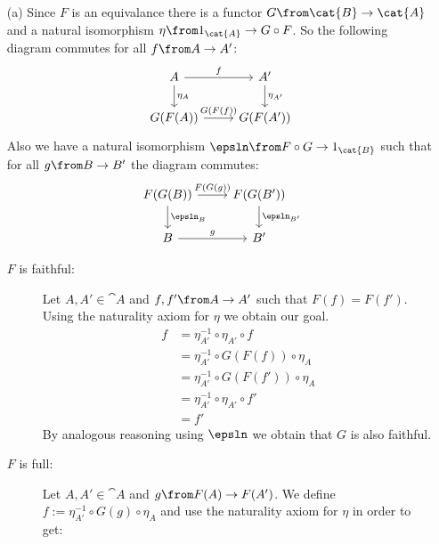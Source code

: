 \begin{answer}
    \begin{itemize}
        \item[(a)]
            Since $F$ is an equivalance there is a functor $G\from \cat{B} \to \cat{A}$ and a natural isomorphism $\eta\from 1_{\cat{A}} \to G \circ F$.
            So the following diagram commutes for all $f\from A \to A'$:
            \[
                \begin{tikzcd}
                    A \arrow{r}{f} \arrow{d}{\eta_A} & A' \arrow{d}{\eta_{A'}} \\
                    G(F(A)) \arrow{r}{G(F(f))}       & G(F(A'))
                \end{tikzcd}
            \]
            Also we have a natural isomorphism $\epsln\from F \circ G \to 1_{\cat{B}}$ such that for all $g\from B \to B'$ the diagram commutes:
            \[
                \begin{tikzcd}
                    F(G(B)) \arrow{d}{\epsln_{B}} \arrow{r}{F(G(g))} & F(G(B')) \arrow{d}{\epsln_{B'}} \\
                    B \arrow{r}{g}  & B'
                \end{tikzcd}
            \]
            \begin{description}
                \item[$F$ is faithful:]
                    Let $A, A' \in \cat{A}$ and $f,f'\from A \to A'$ such that $F(f) = F(f')$.
                    Using the naturality axiom for $\eta$ we obtain our goal.
                    \begin{align*}
                        f & = \eta_{A'}^{-1} \circ \eta_{A'} \circ f\\
                          & = \eta_{A'}^{-1} \circ G(F(f)) \circ \eta_A\\
                          & = \eta_{A'}^{-1} \circ G(F(f')) \circ \eta_A\\
                          & = \eta_{A'}^{-1} \circ \eta_{A'} \circ f'\\
                          & = f'
                    \end{align*}
                    By analogous reasoning using $\epsln$ we obtain that $G$ is also faithful.
                \item[$F$ is full:]
                    Let $A, A' \in \cat{A}$ and $g \from F(A) \to F(A')$.
                    We define $f := \eta_{A'}^{-1} \circ G(g) \circ \eta_A$ and use the naturality axiom for $\eta$ in order to get:
                    \begin{align*}

\end{align*}
\end{description}
\end{itemize}
\end{answer}
